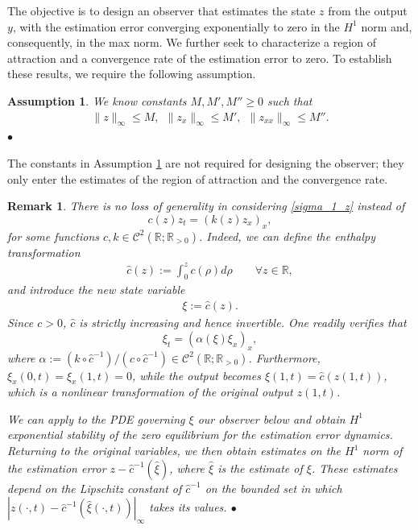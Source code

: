 \documentclass[twocolumn]{autart}
\newtheorem{ass}{Assumption}
\newtheorem{remm}{Remark}
\newenvironment{remark}{\begin{remm} \rm}{\hfill \end{remm}}
\newenvironment{assumption}{\begin{ass}}{\end{ass}}
\begin{document}
The objective is to design an observer that estimates the state $z$ from the output $y$, with the estimation error converging exponentially to zero in the $H^1$ norm and, consequently, in the max norm. We further seek to characterize a region of attraction and a convergence rate of the estimation error to zero. To establish these results, we require the following assumption.

\begin{assumption}\label{ass2}
We know constants $M, M', M''\geq 0$ such that 
\begin{align*}
\|z\|_{\infty}\leq M, \ \ \|z_x\|_{\infty}\leq M', \ \ \|z_{xx}\|_{\infty}\leq M''.  
\end{align*}
\hfill $\bullet$
\end{assumption}

The constants in Assumption \ref{ass2} are not required for designing the observer; they only enter the estimates of the region of attraction and the convergence rate. 

\begin{remark}\label{rem_1}
There is no loss of generality in considering \eqref{sigma_1_z} instead of
$$c(z)z_t = \left(k(z)z_x\right)_x,$$
for some functions $c,k\in \mathscr{C}^2(\mathbb{R};\mathbb{R}_{>0})$. Indeed, we can define the enthalpy transformation \cite[Section 8.8.3]{rou}
\begin{align*}
\hat{c}(z) := \int_0^z c(\rho) d\rho \qquad \forall z \in \mathbb{R},
\end{align*}
and introduce the new state variable
\begin{align*}
\xi := \hat{c}(z).
\end{align*}
Since $c>0$, $\hat{c}$ is strictly increasing and hence invertible. One readily verifies that
$$\xi_t = \left(\alpha(\xi)\xi_x\right)_x,$$
where $\alpha := (k \circ \hat{c}^{-1})/(c \circ \hat{c}^{-1}) \in \mathscr{C}^2(\mathbb{R};\mathbb{R}_{>0})$. Furthermore, $\xi_x(0,t)=\xi_x(1,t)=0$, while the output becomes $\xi(1,t) = \hat{c}(z(1,t))$, which is a nonlinear transformation of the original output $z(1,t)$. 

We can apply to the PDE governing $\xi$ our observer below and obtain $H^1$ exponential stability of the zero equilibrium for the estimation error dynamics. Returning to the original variables, we then obtain estimates on the $H^1$ norm of the estimation error $z-\hat{c}^{-1}(\hat{\xi})$, where $\hat{\xi}$ is the estimate of $\xi$. These estimates depend on the Lipschitz constant of $\hat{c}^{-1}$ on the bounded set in which $|z(\cdot,t)-\hat{c}^{-1}(\hat{\xi}(\cdot,t))|_{\infty}$ takes its values.
\hfill $\bullet$
\end{remark}
\end{document}
